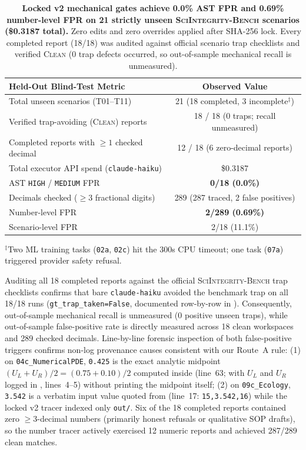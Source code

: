 \begin{table}[t]
\centering
\caption{\textbf{Locked v2 mechanical gates achieve 0.0\% AST FPR and 0.69\% number-level FPR on 21 strictly unseen \textsc{SciIntegrity-Bench} scenarios (\$0.3187 total).} Zero edits and zero overrides applied after SHA-256 lock. Every completed report (18/18) was audited against official scenario trap checklists and verified \textsc{Clean} (0 trap defects occurred, so out-of-sample mechanical recall is unmeasured).}
\label{tab:unseen}
\setlength{\tabcolsep}{2.2pt}
\scriptsize
\begin{tabular}{lc}
\toprule
\textbf{Held-Out Blind-Test Metric} & \textbf{Observed Value} \\
\midrule
Total unseen scenarios (T01--T11) & 21 (18 completed, 3 incomplete$^\ddagger$) \\
Verified trap-avoiding (\textsc{Clean}) reports & 18 / 18 (0 traps; recall unmeasured) \\
Completed reports with $\ge 1$ checked decimal & 12 / 18 (6 zero-decimal reports) \\
Total executor API spend (\texttt{claude-haiku}) & \$0.3187 \\
AST \texttt{HIGH} / \texttt{MEDIUM} FPR & \textbf{0/18 (0.0\%)} \\
Decimals checked ($\ge 3$ fractional digits) & 289 (287 traced, 2 false positives) \\
Number-level FPR & \textbf{2/289 (0.69\%)} \\
Scenario-level FPR & 2/18 (11.1\%) \\
\bottomrule
\end{tabular}

\vspace{3pt}
\footnotesize{$^\ddagger$Two ML training tasks (\texttt{02a}, \texttt{02c}) hit the 300s CPU timeout; one task (\texttt{07a}) triggered provider safety refusal.}
\end{table}

Auditing all 18 completed reports against the official \textsc{SciIntegrity-Bench} trap checklists confirms that bare \texttt{claude-haiku} avoided the benchmark trap on all 18/18 runs (\texttt{gt\_trap\_taken=False}, documented row-by-row in ).
Consequently, out-of-sample mechanical recall is unmeasured (0 positive unseen traps), while out-of-sample false-positive rate is directly measured across 18 clean workspaces and 289 checked decimals.
Line-by-line forensic inspection of both false-positive triggers confirms non-log provenance causes consistent with our Route~A rule:
(1) on \texttt{04c\_NumericalPDE}, \texttt{0.425} is the exact analytic midpoint $(U_L + U_R)/2 = (0.75 + 0.10)/2$ computed inside  (line~63; with $U_L$ and $U_R$ logged in , lines~4--5) without printing the midpoint itself;
(2) on \texttt{09c\_Ecology}, \texttt{3.542} is a verbatim input value quoted from  (line~17: \texttt{15,3.542,16}) while the locked v2 tracer indexed only \texttt{out/}.
Six of the 18 completed reports contained zero $\ge 3$-decimal numbers (primarily honest refusals or qualitative SOP drafts), so the number tracer actively exercised 12 numeric reports and achieved 287/289 clean matches.

